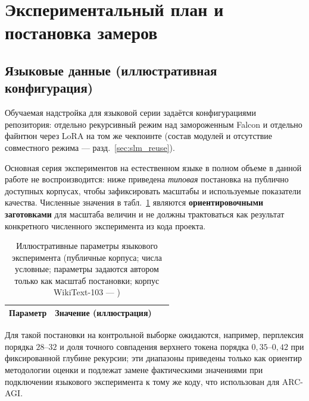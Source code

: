 \section{Экспериментальный план и постановка замеров}

%
\newcommand{\NlpTabRows}{}%
\DTLforeach*{nlpparams}{\prm=param,\vl=colvalue}{%
  \eappto\NlpTabRows{\expandonce{\prm} & \expandonce{\vl}\\\noexpand\hline}%
}%

\subsection{Языковые данные (иллюстративная конфигурация)}

Обучаемая надстройка для языковой серии задаётся конфигурациями репозитория: отдельно рекурсивный
режим над замороженным Falcon и отдельно файнтюн через LoRA на том же чекпоинте (состав модулей и
отсутствие совместного режима --- разд.~\ref{sec:slm_reuse}).

Основная серия экспериментов на естественном языке в полном объеме в данной работе не
воспроизводится: ниже приведена \emph{типовая} постановка на публично доступных корпусах, чтобы
зафиксировать масштабы и используемые показатели качества. Численные значения в
табл.~\ref{tab:main_params} являются \textbf{ориентировочными заготовками} для масштаба величин и
не должны трактоваться как результат конкретного численного эксперимента из кода проекта.

\begin{table}[H]
\centering
\caption{Иллюстративные параметры языкового эксперимента (публичные корпуса; числа условные;
параметры задаются автором только как масштаб постановки; корпус WikiText-103 ---
\cite{merity2016})}
\label{tab:main_params}
\begin{tabular}{|l|p{0.72\linewidth}|}
\hline
Параметр & Значение (иллюстрация) \\
\hline
\NlpTabRows
\end{tabular}
\end{table}

Для такой постановки на контрольной выборке ожидаются, например, перплексия порядка \(28\)--\(32\)
и доля точного совпадения верхнего токена порядка \(0{,}35\)--\(0{,}42\) при фиксированной глубине
рекурсии; эти диапазоны приведены только как ориентир методологии оценки и подлежат замене
фактическими значениями при подключении языкового эксперимента к тому же коду, что использован для
ARC-AGI.

